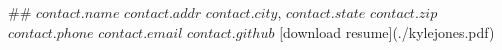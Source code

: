 ## $contact.name$
$contact.addr$  
$contact.city$, $contact.state$ $contact.zip$  
$contact.phone$  
$contact.email$  
$contact.github$  
[download resume](./kylejones.pdf)
